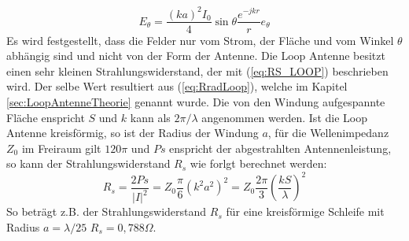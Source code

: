 \begin{equation}
E_{\theta}=\dfrac{(ka)^2I_{0}}{4}\sin \theta \dfrac{e^{-jkr}}{r} e_{\theta}
\end{equation}
Es wird festgestellt, dass die Felder nur vom Strom, der Fläche und vom Winkel $\theta$ abhängig sind
und nicht von der Form der Antenne. 
Die Loop Antenne besitzt einen sehr kleinen Strahlungswiderstand, der mit (\ref{eq:RS_LOOP}) beschrieben wird. Der selbe Wert resultiert aus  (\ref{eq:RradLoop}), welche im Kapitel \ref{sec:LoopAntenneTheorie} genannt wurde. Die von den Windung aufgespannte Fläche enspricht $S$ und $k$ kann als $2\pi/\lambda$ angenommen werden. Ist die Loop Antenne kreisförmig, so ist der Radius der Windung $a$, für die Wellenimpedanz $Z_0$ im Freiraum gilt $120\pi$ und $Ps$ enspricht der abgestrahlten Antennenleistung, so kann der Strahlungswiderstand $R_s$ wie forlgt berechnet werden:
\begin{equation}\label{eq:RS_LOOP}
R_{s}=\dfrac{2Ps}{|I|^{2}}=Z_{0}\dfrac{\pi}{6}(k^{2}a^{2})^{2}=Z_{0}\dfrac{2\pi}{3}\left(\dfrac{kS}{\lambda}\right)^{2} 
\end{equation}
So beträgt z.B. der Strahlungswiderstand $R_{s}$ für eine kreisförmige Schleife mit Radius $a = \lambda/25$  $R_{s} = 0,788\Omega$.


